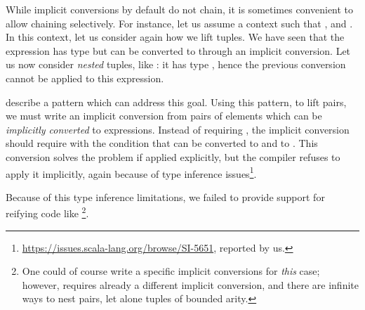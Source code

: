 While implicit conversions by default do not chain, it is sometimes convenient to allow chaining selectively.
For instance, let us assume a context such that ,  and .
In this context, let us consider again how we lift tuples. We have seen that the expression  has type  but can be converted to  through an implicit conversion. Let us now consider \emph{nested} tuples, like : it has type , hence the previous conversion cannot be applied to this expression.

\citet[Ch.~21]{Odersky11book} describe a pattern which can address this goal. Using this pattern, to lift pairs, we must write an implicit conversion from pairs of elements which can be \emph{implicitly converted} to expressions. Instead of requiring
, the implicit conversion should require  with the condition that  can be converted to  and  to . This conversion solves the problem if applied explicitly,
but the compiler refuses to apply it implicitly, again because of type inference issues\footnote{\url{https://issues.scala-lang.org/browse/SI-5651}, reported by us.}.

Because of this type inference limitations, we failed to provide support for reifying code like \footnote{One could of course write a specific implicit conversions for \emph{this} case; however,  requires already a different implicit conversion, and there are infinite ways to nest pairs, let alone tuples of bounded arity.}.



%
%


